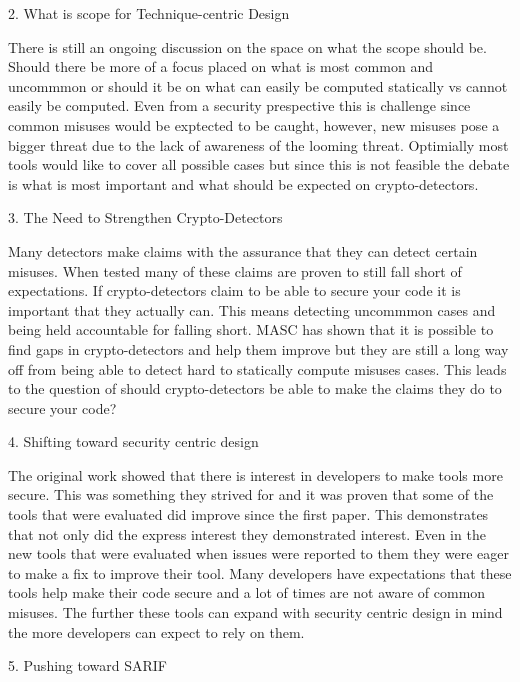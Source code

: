 2. What is scope for Technique-centric Design

There is still an ongoing discussion on the space on what the scope should be. Should there be more of a focus placed on what is most common and uncommmon or should it be on what can easily be computed statically vs cannot easily be computed. Even from a security prespective this is challenge since common misuses would be exptected to be caught, however, new misuses pose a bigger threat due to the lack of awareness of the looming threat. Optimially most tools would like to cover all possible cases but since this is not feasible the debate is what is most important and what should be expected on crypto-detectors.

3. The Need to Strengthen Crypto-Detectors

Many detectors make claims with the assurance that they can detect certain misuses. When tested many of these claims are proven to still fall short of expectations. If crypto-detectors claim to be able to secure your code it is important that they actually can. This means detecting uncommmon cases and being held accountable for falling short. MASC has shown that it is possible to find gaps in crypto-detectors and help them improve but they are still a long way off from being able to detect hard to statically compute misuses cases. This leads to the question of should crypto-detectors be able to make the claims they do to secure your code?

4. Shifting toward security centric design

The original work showed that there is interest in developers to make tools more secure. This was something they strived for and it was proven that some of the tools that were evaluated did improve since the first paper. This demonstrates that not only did the express interest they demonstrated interest. Even in the new tools that were evaluated when issues were reported to them they were eager to make a fix to improve their tool. Many developers have expectations that these tools help make their code secure and a lot of times are not aware of common misuses. The further these tools can expand with security centric design in mind the more developers can expect to rely on them.

5. Pushing toward SARIF

